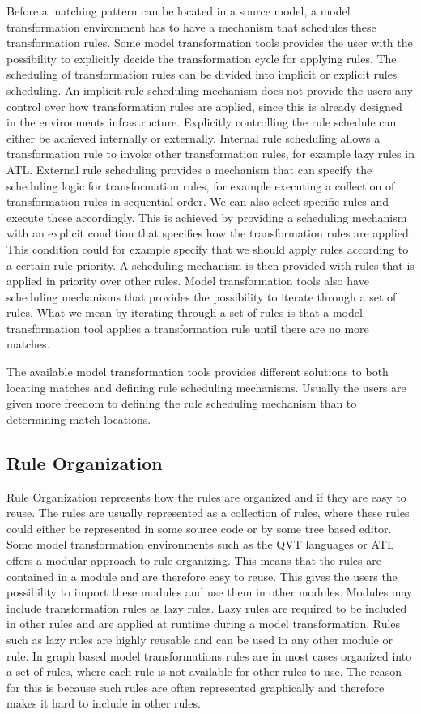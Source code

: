 Before a matching pattern can be located in a source model, a model
transformation environment has to have a mechanism that schedules these
transformation rules. Some model transformation tools provides the user with the
possibility to explicitly decide the transformation cycle for applying rules.
The scheduling of transformation rules can be divided into implicit or explicit
rules scheduling. An implicit rule scheduling mechanism does not provide the
users any control over how transformation rules are applied, since this is already
designed in the environments infrastructure. Explicitly controlling the rule
schedule can either be achieved internally or externally. Internal rule
scheduling allows a transformation rule to invoke other transformation rules, for example
lazy rules in ATL. External rule scheduling provides a mechanism that can
specify the scheduling logic for transformation rules, for example executing a
collection of transformation rules in sequential order. We can also select
specific rules and execute these accordingly. This is achieved by providing a
scheduling mechanism with an explicit condition that specifies how the
transformation rules are applied. This condition could for example specify that
we should apply rules according to a certain rule priority. A scheduling
mechanism is then provided with rules that is applied in priority over other
rules. Model transformation tools also have scheduling mechanisms that provides
the possibility to iterate through a set of rules. What we mean by iterating
through a set of rules is that a model transformation tool applies a
transformation rule until there are no more matches. 

The available model transformation tools provides different solutions to both
locating matches and defining rule scheduling mechanisms. Usually the users are
given more freedom to defining the rule scheduling mechanism than to
determining match locations.

\subsection{Rule Organization}

Rule Organization represents how the rules are organized and if they are easy to
reuse. The rules are usually represented as a collection of rules, where these
rules could either be represented in some source code or by some tree based
editor. Some model transformation environments such as the QVT languages or ATL
offers a modular approach to rule organizing. This means that the rules are
contained in a module and are therefore easy to reuse. This gives the users the
possibility to import these modules and use them in other modules. Modules may
include transformation rules as lazy rules. Lazy rules are required to be
included in other rules and are applied at runtime during a model
transformation. Rules such as lazy rules are highly reusable and can be used in
any other module or rule. In graph based model transformations rules are in
most cases organized into a set of rules, where each rule is not available for
other rules to use. The reason for this is because such rules are often
represented graphically and therefore makes it hard to include in other rules. 

